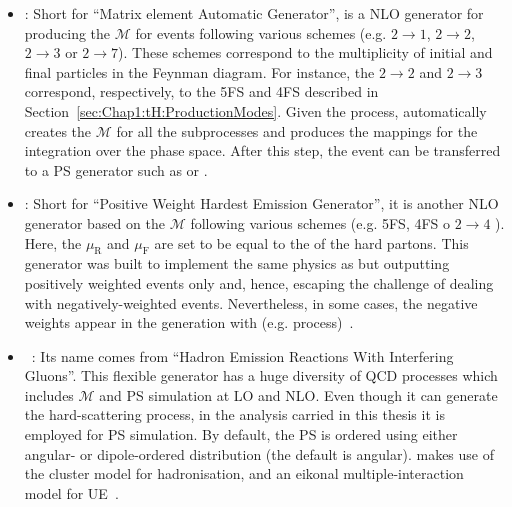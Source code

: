 \begin{itemize}
	\item \textbf{\MGNLO}: Short for ``Matrix element Automatic Generator'', is a NLO
		generator for producing the $\mathcal{M}$ for events following 
		various schemes (e.g.
		$2 \rightarrow 1$, $2 \rightarrow 2$, $2 \rightarrow 3$ or $2 \rightarrow 7$). %
		These schemes correspond to the multiplicity of initial and final particles
		in the Feynman diagram. For instance, the $2 \rightarrow 2$ and $2 \rightarrow 3$
		correspond, respectively, to the 5FS and 4FS described
		in Section~\ref{sec:Chap1:tH:ProductionModes}.
		Given the process, \MGNLO automatically creates the $\mathcal{M}$  for all the 
		subprocesses and produces the mappings for the integration over the phase space. 
		After this step, the event can be transferred to a PS generator such as \Herwig or \Pythia.
		
	\item \textbf{\POWHEGBOX}: Short for ``Positive Weight Hardest Emission Generator'', it is
		another NLO generator based on the $\mathcal{M}$ following various schemes 
		(e.g. 5FS, 4FS o $2 \rightarrow 4$ ). %
		Here, the 
		$\mu_{\text{R}}$ and $\mu_{\text{F}}$ are set to be equal to the \pT of the hard partons.
		This generator was built to implement the same physics as \MGNLO but
		outputting positively weighted events only and, hence, escaping the challenge of
		dealing with negatively-weighted events. Nevertheless, in some cases, the negative weights
		appear in the generation with (e.g. \tchannel process)~\cite{Alioli:2010qp}.

	\item \textbf{\Herwig[7]}~\cite{Bahr:2008pv, Bellm:2015jjp}: Its name comes from ``Hadron Emission Reactions With Interfering Gluons''.
		This flexible generator has a huge diversity of QCD processes which includes $\mathcal{M}$ 
		and PS simulation at LO and NLO. Even though it can generate the hard-scattering process, in
		the analysis carried in this thesis it is employed for PS simulation. 
		By default, the PS is ordered 
		using either angular- or 
		dipole-ordered distribution (the default is angular). \Herwig[7] makes use of the cluster model for hadronisation, 
		and an eikonal multiple-interaction model for UE~\cite{Borozan:2002fk}. 
		

\end{itemize}
